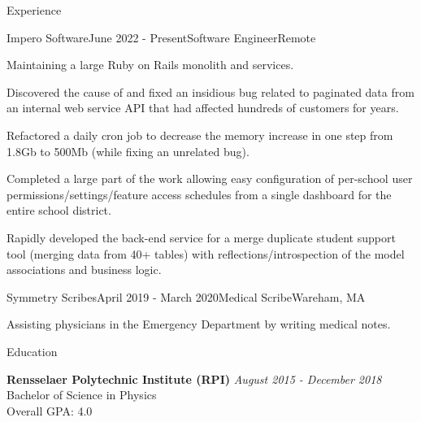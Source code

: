 \documentclass{resume}
\begin{document}
  \begin{rSection}{Experience}

  \begin{rSubsection}{Impero Software}{June 2022 - Present}{Software Engineer}{Remote}
      \item Maintaining a large Ruby on Rails monolith and services. \item Discovered the cause of and fixed an insidious bug related to paginated data from an internal web service API that had affected hundreds of customers for years.
      \item Refactored a daily cron job to decrease the memory increase in one step from 1.8Gb to 500Mb (while fixing an unrelated bug). 
      \item Completed a large part of the work allowing easy configuration of per-school user permissions/settings/feature access schedules from a single dashboard for the entire school district.
      \item Rapidly developed the back-end service for a merge duplicate student support tool (merging data from 40+ tables) with reflections/introspection of the model associations and business logic.
  \end{rSubsection}

    \begin{rSubsection}{Symmetry Scribes}{April 2019 - March 2020}{Medical Scribe}{Wareham, MA}
    \item Assisting physicians in the Emergency Department by writing medical notes.
    \end{rSubsection}

  
  \end{rSection}

  \begin{rSection}{Education}



    {\bf Rensselaer Polytechnic Institute (RPI)} \hfill {\em August 2015 - December 2018} \\ 
    Bachelor of Science in Physics  \\
    Overall GPA: 4.0
  \end{rSection}
\end{document}

